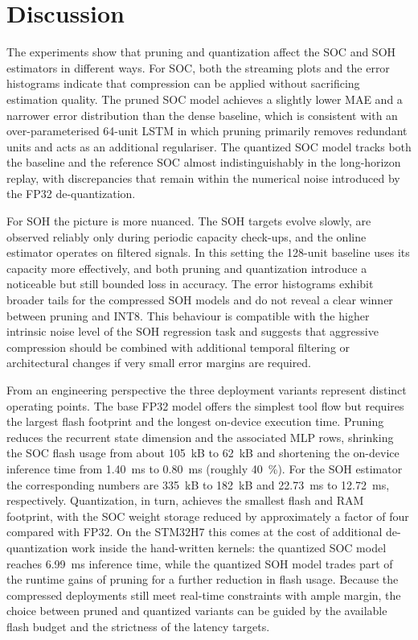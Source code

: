 \documentclass[review]{elsarticle}
\begin{document}
\section{Discussion}
The experiments show that pruning and quantization affect the SOC and SOH estimators in different ways. For SOC, both the streaming plots and the error histograms indicate that compression can be applied without sacrificing estimation quality. The pruned SOC model achieves a slightly lower MAE and a narrower error distribution than the dense baseline, which is consistent with an over-parameterised 64-unit LSTM in which pruning primarily removes redundant units and acts as an additional regulariser. The quantized SOC model tracks both the baseline and the reference SOC almost indistinguishably in the long-horizon replay, with discrepancies that remain within the numerical noise introduced by the FP32 de-quantization.

For SOH the picture is more nuanced. The SOH targets evolve slowly, are observed reliably only during periodic capacity check-ups, and the online estimator operates on filtered signals. In this setting the 128-unit baseline uses its capacity more effectively, and both pruning and quantization introduce a noticeable but still bounded loss in accuracy. The error histograms exhibit broader tails for the compressed SOH models and do not reveal a clear winner between pruning and INT8. This behaviour is compatible with the higher intrinsic noise level of the SOH regression task and suggests that aggressive compression should be combined with additional temporal filtering or architectural changes if very small error margins are required.

From an engineering perspective the three deployment variants represent distinct operating points. The base FP32 model offers the simplest tool flow but requires the largest flash footprint and the longest on-device execution time. Pruning reduces the recurrent state dimension and the associated MLP rows, shrinking the SOC flash usage from about 105~kB to 62~kB and shortening the on-device inference time from 1.40~ms to 0.80~ms (roughly 40~\%). For the SOH estimator the corresponding numbers are 335~kB to 182~kB and 22.73~ms to 12.72~ms, respectively. Quantization, in turn, achieves the smallest flash and RAM footprint, with the SOC weight storage reduced by approximately a factor of four compared with FP32. On the STM32H7 this comes at the cost of additional de-quantization work inside the hand-written kernels: the quantized SOC model reaches 6.99~ms inference time, while the quantized SOH model trades part of the runtime gains of pruning for a further reduction in flash usage. Because the compressed deployments still meet real-time constraints with ample margin, the choice between pruned and quantized variants can be guided by the available flash budget and the strictness of the latency targets.
\end{document}
